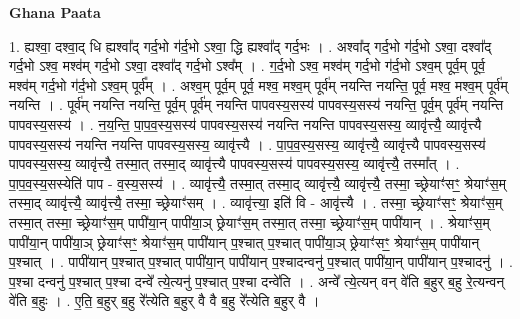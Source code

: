 \documentclass[17pt]{extarticle}
\begin{document}
\textbf{Ghana Paata } \newline

1. ह्यश्वा॒ दश्वा॒द् धि ह्यश्वा᳚द् गर्द॒भो ग॑र्द॒भो ऽश्वा॒ द्धि ह्यश्वा᳚द् गर्द॒भः । . अश्वा᳚द् गर्द॒भो ग॑र्द॒भो ऽश्वा॒ दश्वा᳚द् गर्द॒भो ऽश्व॒ मश्व॑म् गर्द॒भो ऽश्वा॒ दश्वा᳚द् गर्द॒भो ऽश्व᳚म् । . ग॒र्द॒भो ऽश्व॒ मश्व॑म् गर्द॒भो ग॑र्द॒भो ऽश्व॒म् पूर्व॒म् पूर्व॒ मश्व॑म् गर्द॒भो ग॑र्द॒भो ऽश्व॒म् पूर्व᳚म् । . अश्व॒म् पूर्व॒म् पूर्व॒ मश्व॒ मश्व॒म् पूर्व॑म् नयन्ति नयन्ति॒ पूर्व॒ मश्व॒ मश्व॒म् पूर्व॑म् नयन्ति । . पूर्व॑म् नयन्ति नयन्ति॒ पूर्व॒म् पूर्व॑म् नयन्ति पापवस्य॒सस्य॑ पापवस्य॒सस्य॑ नयन्ति॒ पूर्व॒म् पूर्व॑म् नयन्ति पापवस्य॒सस्य॑ । . न॒य॒न्ति॒ पा॒प॒व॒स्य॒सस्य॑ पापवस्य॒सस्य॑ नयन्ति नयन्ति पापवस्य॒सस्य॒ व्यावृ॑त्त्यै॒ व्यावृ॑त्त्यै पापवस्य॒सस्य॑ नयन्ति नयन्ति पापवस्य॒सस्य॒ व्यावृ॑त्त्यै । . पा॒प॒व॒स्य॒सस्य॒ व्यावृ॑त्त्यै॒ व्यावृ॑त्त्यै पापवस्य॒सस्य॑ पापवस्य॒सस्य॒ व्यावृ॑त्त्यै॒ तस्मा॒त् तस्मा॒द् व्यावृ॑त्त्यै पापवस्य॒सस्य॑ पापवस्य॒सस्य॒ व्यावृ॑त्त्यै॒ तस्मा᳚त् । . पा॒प॒व॒स्य॒सस्येति॑ पाप - व॒स्य॒सस्य॑ । . व्यावृ॑त्त्यै॒ तस्मा॒त् तस्मा॒द् व्यावृ॑त्त्यै॒ व्यावृ॑त्त्यै॒ तस्मा॒ च्छ्रेयाꣳ॑सꣳ॒॒ श्रेयाꣳ॑स॒म् तस्मा॒द् व्यावृ॑त्त्यै॒ व्यावृ॑त्त्यै॒ तस्मा॒ च्छ्रेयाꣳ॑सम् । . व्यावृ॑त्त्या॒ इति॑ वि - आवृ॑त्त्यै । . तस्मा॒ च्छ्रेयाꣳ॑सꣳ॒॒ श्रेयाꣳ॑स॒म् तस्मा॒त् तस्मा॒ च्छ्रेयाꣳ॑स॒म् पापी॑या॒न् पापी॑या॒ञ् छ्रेयाꣳ॑स॒म् तस्मा॒त् तस्मा॒ च्छ्रेयाꣳ॑स॒म् पापी॑यान् । . श्रेयाꣳ॑स॒म् पापी॑या॒न् पापी॑या॒ञ् छ्रेयाꣳ॑सꣳ॒॒ श्रेयाꣳ॑स॒म् पापी॑यान् प॒श्चात् प॒श्चात् पापी॑या॒ञ् छ्रेयाꣳ॑सꣳ॒॒ श्रेयाꣳ॑स॒म् पापी॑यान् प॒श्चात् । . पापी॑यान् प॒श्चात् प॒श्चात् पापी॑या॒न् पापी॑यान् प॒श्चादन्वनु॑ प॒श्चात् पापी॑या॒न् पापी॑यान् प॒श्चादनु॑ । . प॒श्चा दन्वनु॑ प॒श्चात् प॒श्चा दन्वे᳚ त्ये॒त्यनु॑ प॒श्चात् प॒श्चा दन्वे॑ति । . अन्वे᳚ त्ये॒त्यन् वन् वे॑ति ब॒हुर् ब॒हु रे॒त्यन्वन् वे॑ति ब॒हुः । . ए॒ति॒ ब॒हुर् ब॒हु रे᳚त्येति ब॒हुर् वै वै ब॒हु रे᳚त्येति ब॒हुर् वै । \newline
\end{document}
